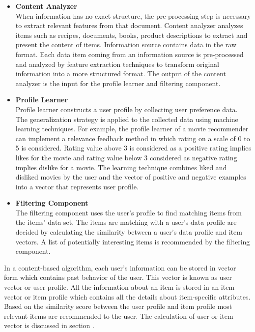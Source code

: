 \begin{itemize}
\item \textbf{Content Analyzer} 
\\
When information has no exact structure, the pre-processing step is necessary to extract relevant features from that document. Content analyzer analyzes items such as recipes, documents, books, product descriptions to extract and present the content of items. Information source contains data in the raw format. Each data item coming from an information source is pre-processed and analyzed by feature extraction techniques to transform original information into a more structured format. The output of the content analyzer is the input for the profile learner and filtering component.

\item \textbf{Profile Learner} 
\\
Profile learner constructs a user profile by collecting user preference data. The generalization strategy is applied to the collected data using machine learning techniques. For example, the profile learner of a movie recommender can implement a relevance feedback method in which rating on a scale of 0 to 5 is considered. Rating value above 3 is considered as a positive rating implies likes for the movie and rating value below 3 considered as negative rating implies dislike for a movie. The learning technique combines liked and disliked movies by the user and the vector of positive and negative examples into a vector that represents user profile. 

\item \textbf{Filtering Component}
\\
The filtering component uses the user's profile to find matching items from the items' data set. The items are matching with a user's data profile are decided by calculating the similarity between a user's data profile and item vectors. A list of potentially interesting items is recommended by the filtering component. 
\end{itemize}
\noindent
In a content-based algorithm, each user's information can be stored in vector form which contains past behavior of the user. This vector is known as user vector or user profile. All the information about an item is stored in an item vector or item profile which contains all the details about item-specific attributes. Based on the similarity score between the user profile and item profile most relevant items are recommended to the user. The calculation of user or item vector is discussed in section .

